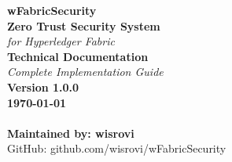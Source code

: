 \documentclass[12pt,a4paper]{report}
\begin{document}
\begin{titlepage}
    \centering
    \vspace*{2cm}
    
    {\color{primary}\Huge\textbf{wFabricSecurity}}\\[0.5cm]
    {\color{secondary}\Large\textbf{Zero Trust Security System}}\\[1cm]
    {\Large\textit{for Hyperledger Fabric}}\\[2cm]
    
    \vspace{1cm}
    {\Large\textbf{Technical Documentation}}\\[0.5cm]
    {\large\textit{Complete Implementation Guide}}\\[2cm]
    
    \vspace{2cm}
    {\color{blue!70!black}\Large\textbf{Version 1.0.0}}\\[0.5cm]
    {\large\textbf{\today}}\\[3cm]
    
    \\[2cm]
    
    \vfill
    \large\textbf{Maintained by: wisrovi}\\
    GitHub: github.com/wisrovi/wFabricSecurity
\end{titlepage}
\end{document}
